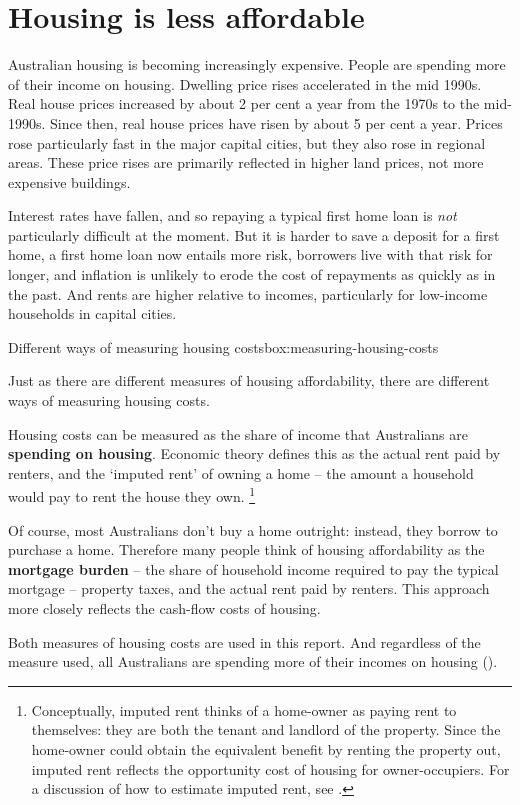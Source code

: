\chapter{Housing is less affordable}\label{chap:housing-is-less-affordable}

Australian housing is becoming increasingly expensive.
People are spending more of their income on housing.
Dwelling price rises accelerated in the mid 1990s.
Real house prices increased by about 2 per cent a year from the 1970s to the mid-1990s.
Since then, real house prices have risen by about 5 per cent a year.
Prices rose particularly fast in the major capital cities, but they also rose in regional areas.
These price rises are primarily reflected in higher land prices, not more expensive buildings.

Interest rates have fallen, and so repaying a typical first home loan is \emph{not} particularly difficult at the moment.
But it is harder to save a deposit for a first home, a first home loan now entails more risk, borrowers live with that risk for longer, and inflation is unlikely to erode the cost of repayments as quickly as in the past.
And rents are higher relative to incomes, particularly for low-income households in capital cities.

\begin{smallbox}{Different ways of measuring housing costs}{box:measuring-housing-costs}

Just as there are different measures of housing affordability, there are different ways of measuring housing costs. 

Housing costs can be measured as the share of income that Australians are \textbf{spending on housing}.
Economic theory defines this as the actual rent paid by renters, and the `imputed rent' of owning a home -- the amount a household would pay to rent the house they own.%
    \footnote{Conceptually, imputed rent thinks of a home-owner as paying rent to themselves: they are both the tenant and landlord of the property.
    Since the home-owner could obtain the equivalent benefit by renting the property out, imputed rent reflects the opportunity cost of housing for owner-occupiers. 
    For a discussion of how to estimate imputed rent, see \textcite[][Box~2.3]{PC-2015-Housing-decisions-elderly}.} 

Of course, most Australians don't buy a home outright: instead, they borrow to purchase a home. Therefore many people think of housing affordability as the \textbf{mortgage burden} -- the share of household income required to pay the typical mortgage -- property taxes, and the actual rent paid by renters. This approach more closely reflects the cash-flow costs of housing.

Both measures of housing costs are used in this report. And regardless of the measure used, all Australians are spending more of their incomes on housing ().

\end{smallbox}

